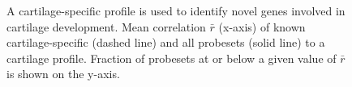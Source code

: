 \documentclass{bioinfo}
\begin{document}
\begin{figure}[!tpb]
\label{figure:cartilage_cdf}
\centerline{}
\caption{A cartilage-specific profile is used to identify novel genes involved
in cartilage development.  Mean correlation $\bar{r}$ (x-axis) of known
cartilage-specific (dashed line) and all probesets (solid line) to a cartilage
profile.  Fraction of probesets at or below a given value of $\bar{r}$ is shown
on the y-axis.}
\end{figure}


\end{document}
